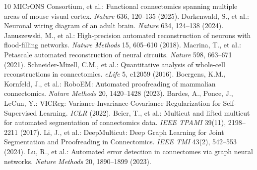 \documentclass[10pt,twocolumn,letterpaper]{article}
\begin{document}
\begin{thebibliography}{10}
 MICrONS Consortium, et al.: Functional connectomics spanning multiple areas of mouse visual cortex. \textit{Nature} 636, 120--135 (2025).
 Dorkenwald, S., et al.: Neuronal wiring diagram of an adult brain. \textit{Nature} 634, 124--138 (2024).
 Januszewski, M., et al.: High-precision automated reconstruction of neurons with flood-filling networks. \textit{Nature Methods} 15, 605--610 (2018).
 Macrina, T., et al.: Petascale automated reconstruction of neural circuits. \textit{Nature} 598, 663--671 (2021).
 Schneider-Mizell, C.M., et al.: Quantitative analysis of whole-cell reconstructions in connectomics. \textit{eLife} 5, e12059 (2016).
 Boergens, K.M., Kornfeld, J., et al.: RoboEM: Automated proofreading of mammalian connectomics. \textit{Nature Methods} 20, 1420--1428 (2023).
 Bardes, A., Ponce, J., LeCun, Y.: VICReg: Variance-Invariance-Covariance Regularization for Self-Supervised Learning. \textit{ICLR} (2022).
 Beier, T., et al.: Multicut and lifted multicut for automated segmentation of connectomics data. \textit{IEEE TPAMI} 39(11), 2198--2211 (2017).
 Li, J., et al.: DeepMulticut: Deep Graph Learning for Joint Segmentation and Proofreading in Connectomics. \textit{IEEE TMI} 43(2), 542--553 (2024).
 Lu, R., et al.: Automated error detection in connectomes via graph neural networks. \textit{Nature Methods} 20, 1890--1899 (2023).
\end{thebibliography}
\end{document}
